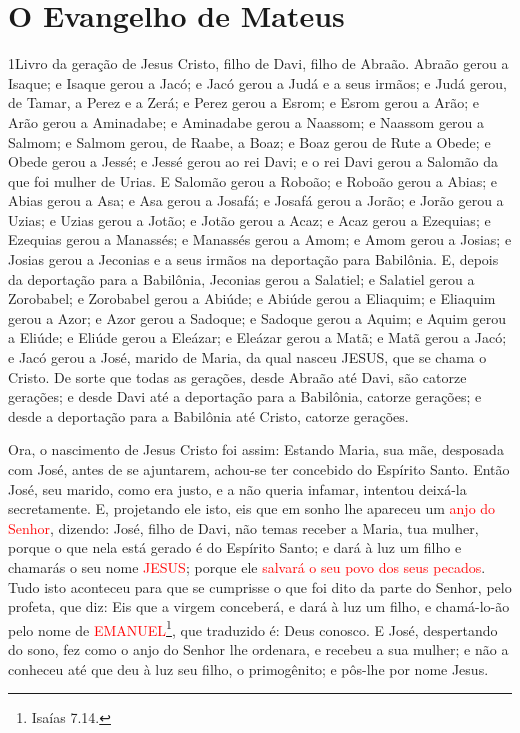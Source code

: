 \thispagestyle{empty}
\chapter*{O Evangelho de Mateus}


\lettrine{1} Livro da geração de Jesus Cristo, filho de Davi,
filho de Abraão. Abraão gerou a Isaque; e Isaque gerou a Jacó; e
Jacó gerou a Judá e a seus irmãos; e Judá gerou, de Tamar, a
Perez e a Zerá; e Perez gerou a Esrom; e Esrom gerou a Arão; e
Arão gerou a Aminadabe; e Aminadabe gerou a Naassom; e Naassom gerou
a Salmom; e Salmom gerou, de Raabe, a Boaz; e Boaz gerou de Rute
a Obede; e Obede gerou a Jessé; e Jessé gerou ao rei Davi; e o
rei Davi gerou a Salomão da que foi mulher de Urias. E Salomão
gerou a Roboão; e Roboão gerou a Abias; e Abias gerou a Asa; e
Asa gerou a Josafá; e Josafá gerou a Jorão; e Jorão gerou a Uzias;
e Uzias gerou a Jotão; e Jotão gerou a Acaz; e Acaz gerou a
Ezequias; e Ezequias gerou a Manassés; e Manassés gerou a
Amom; e Amom gerou a Josias; e Josias gerou a Jeconias e a
seus irmãos na deportação para Babilônia. E, depois da
deportação para a Babilônia, Jeconias gerou a Salatiel; e Salatiel
gerou a Zorobabel; e Zorobabel gerou a Abiúde; e Abiúde gerou
a Eliaquim; e Eliaquim gerou a Azor; e Azor gerou a Sadoque;
e Sadoque gerou a Aquim; e Aquim gerou a Eliúde; e Eliúde
gerou a Eleázar; e Eleázar gerou a Matã; e Matã gerou a Jacó;
e Jacó gerou a José, marido de Maria, da qual nasceu JESUS,
que se chama o Cristo. De sorte que todas as gerações, desde
Abraão até Davi, são catorze gerações; e desde Davi até a deportação
para a Babilônia, catorze gerações; e desde a deportação para a
Babilônia até Cristo, catorze gerações.

Ora, o nascimento de Jesus Cristo foi assim: Estando Maria, sua
mãe, desposada com José, antes de se ajuntarem, achou-se ter
concebido do Espírito Santo. Então José, seu marido, como era
justo, e a não queria infamar, intentou deixá-la secretamente.
E, projetando ele isto, eis que em sonho lhe apareceu um
\textcolor{red}{anjo do Senhor}, dizendo: José, filho de Davi, não temas
receber a Maria, tua mulher, porque o que nela está gerado é do
Espírito Santo; e dará à luz um filho e chamarás o seu nome
\textcolor{red}{JESUS}; porque ele \textcolor{red}{salvará o seu povo dos seus
pecados}. Tudo isto aconteceu para que se cumprisse o que foi
dito da parte do Senhor, pelo profeta, que diz: Eis que a
virgem conceberá, e dará à luz um filho, e chamá-lo-ão pelo nome de
\textcolor{red}{EMANUEL}\footnote{Isaías 7.14.}, que traduzido é: Deus
conosco. E José, despertando do sono, fez como o anjo do
Senhor lhe ordenara, e recebeu a sua mulher; e não a conheceu
até que deu à luz seu filho, o primogênito; e pôs-lhe por nome
Jesus.

